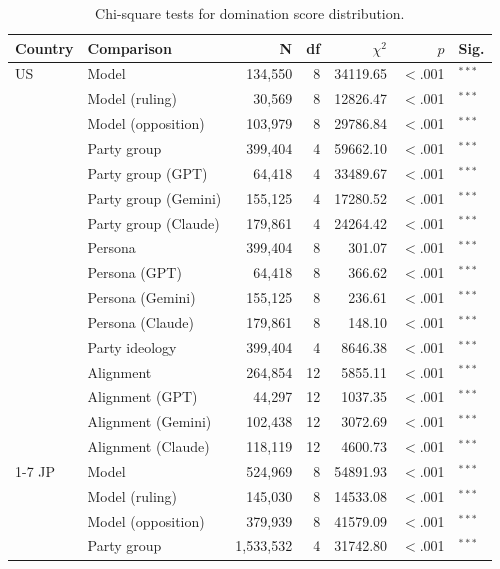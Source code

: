 \begin{table}[t]
\centering
\footnotesize
\setlength{\tabcolsep}{3pt}
\caption{Chi-square tests for domination score distribution.}
\label{tab:domination-score-distribution-tests}
\begin{tabular}{llrrrrl}
\toprule
\textbf{Country} & \textbf{Comparison} & \textbf{N} & \textbf{df} & \textbf{$\chi^2$} & \textbf{$p$} & \textbf{Sig.} \\
\midrule
US & Model & 134{,}550 & 8 & 34119.65 & $<$.001 & $^{***}$ \\
 & Model (ruling) & 30{,}569 & 8 & 12826.47 & $<$.001 & $^{***}$ \\
 & Model (opposition) & 103{,}979 & 8 & 29786.84 & $<$.001 & $^{***}$ \\
 & Party group & 399{,}404 & 4 & 59662.10 & $<$.001 & $^{***}$ \\
 & Party group (GPT) & 64{,}418 & 4 & 33489.67 & $<$.001 & $^{***}$ \\
 & Party group (Gemini) & 155{,}125 & 4 & 17280.52 & $<$.001 & $^{***}$ \\
 & Party group (Claude) & 179{,}861 & 4 & 24264.42 & $<$.001 & $^{***}$ \\
 & Persona & 399{,}404 & 8 & 301.07 & $<$.001 & $^{***}$ \\
 & Persona (GPT) & 64{,}418 & 8 & 366.62 & $<$.001 & $^{***}$ \\
 & Persona (Gemini) & 155{,}125 & 8 & 236.61 & $<$.001 & $^{***}$ \\
 & Persona (Claude) & 179{,}861 & 8 & 148.10 & $<$.001 & $^{***}$ \\
 & Party ideology & 399{,}404 & 4 & 8646.38 & $<$.001 & $^{***}$ \\
 & Alignment & 264{,}854 & 12 & 5855.11 & $<$.001 & $^{***}$ \\
 & Alignment (GPT) & 44{,}297 & 12 & 1037.35 & $<$.001 & $^{***}$ \\
 & Alignment (Gemini) & 102{,}438 & 12 & 3072.69 & $<$.001 & $^{***}$ \\
 & Alignment (Claude) & 118{,}119 & 12 & 4600.73 & $<$.001 & $^{***}$ \\
\cmidrule(lr){1-7}
JP & Model & 524{,}969 & 8 & 54891.93 & $<$.001 & $^{***}$ \\
 & Model (ruling) & 145{,}030 & 8 & 14533.08 & $<$.001 & $^{***}$ \\
 & Model (opposition) & 379{,}939 & 8 & 41579.09 & $<$.001 & $^{***}$ \\
 & Party group & 1{,}533{,}532 & 4 & 31742.80 & $<$.001 & $^{***}$ \\

\end{tabular}
\end{table}
